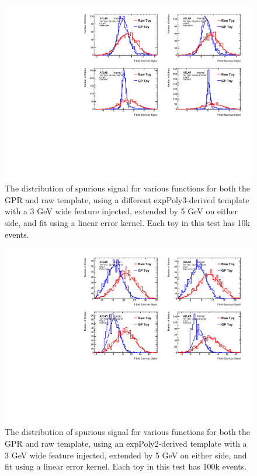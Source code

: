 \begin{figure} 
\begin{center}
  \includegraphics[width=\textwidth]{figures/background/gpr/validation/linear/ToyTest_FitSigVals_highpT_10k_Sig}   
\caption{The distribution of spurious signal for various functions for both the GPR and raw template, using a different expPoly3-derived template with a 3 GeV wide feature injected, extended by 5 GeV on either side, and fit using a linear error kernel. Each toy in this test has 10k events.}
\label{fig:linearkernel_highpt_10k_Sig}
\end{center}
\end{figure}

\begin{figure} 
\begin{center}
  \includegraphics[width=\textwidth]{figures/background/gpr/validation/linear/ToyTest_FitSigVals_lowpT_100k_Sig}   
\caption{The distribution of spurious signal for various functions for both the GPR and raw template, using an expPoly2-derived template with a 3 GeV wide feature injected, extended by 5 GeV on either side, and fit using a linear error kernel. Each toy in this test has 100k events.}
\label{fig:linearkernel_lowpt_100k_Sig}
\end{center}
\end{figure}

